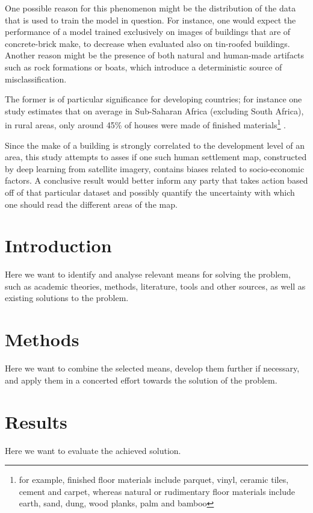 \documentclass[11pt]{article}
\begin{document}
    One possible reason for this phenomenon might be the distribution of the data that is used to train the model
    in question. For instance, one would expect the performance of a model trained exclusively on images of buildings
    that are of concrete-brick make, to decrease when evaluated also on tin-roofed buildings.
    Another reason might be the presence of both natural and human-made artifacts such as rock formations or boats,
    which introduce a deterministic source of misclassification.

    The former is of particular significance for developing countries; for instance one study estimates that
    on average in Sub-Saharan Africa (excluding South Africa), in rural areas, only around 45\% of houses were made
    of finished materials\footnote{for example, finished floor materials include parquet, vinyl, ceramic tiles, cement
    and carpet, whereas natural or rudimentary floor materials include earth, sand, dung, wood planks, palm and bamboo}
    \cite[see][Table 1 and Table S1 in supplementary]{Tusting2019}.

    Since the make of a building is strongly correlated to the development level of an area, this study attempts to
    asses if one such human settlement map, constructed by deep learning from satellite imagery, contains biases
    related to socio-economic factors. A conclusive result would better inform any party that takes action based off of
    that particular dataset and possibly quantify the uncertainty with which one should read the different areas of
    the map.


    \section{Introduction}
    Here we want to identify and analyse relevant means for solving the problem, such as academic theories, methods, literature, tools and other sources, as well as existing solutions to the problem.

    \lipsum[1-1]

    \section{Methods}
    Here we want to combine the selected means, develop them further if necessary, and apply them in a concerted effort towards the solution of the problem.

    \lipsum[1-1]

    \section{Results}
    Here we want to evaluate the achieved solution.
\end{document}
